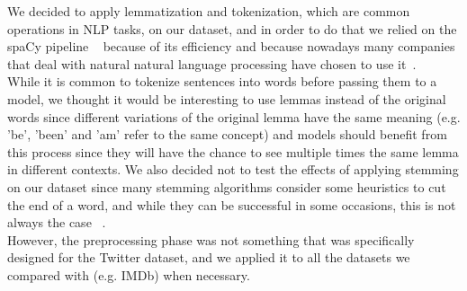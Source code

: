 We decided to apply lemmatization and tokenization, which are common operations in NLP tasks, on our dataset, and in order to do that we relied on the spaCy pipeline ~\cite{startups:spaCy} because of its efficiency and because nowadays many companies that deal with natural natural language processing have chosen to use it~\cite{data:companies_using_spacy}.\\

While it is common to tokenize sentences into words before passing them to a model, we thought it would be interesting to use lemmas instead of the original words since different variations of the original lemma have the same meaning (e.g. 'be', 'been' and 'am' refer to the same concept) and models should benefit from this process since they will have the chance to see multiple times the same lemma in different contexts. We also decided not to test the effects of applying stemming on our dataset since many stemming algorithms consider some heuristics to cut the end of a word, and while they can be successful in some occasions, this is not always the case ~\cite{data:standfordNLP}.\\

However, the preprocessing phase was not something that was specifically designed for the Twitter dataset, and we applied it to all the datasets we compared with (e.g. IMDb) when necessary.
